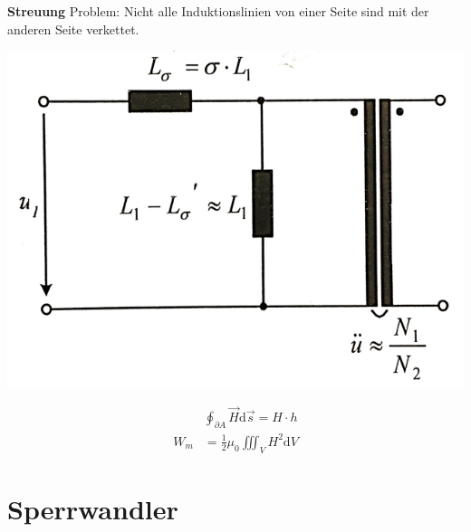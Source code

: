\documentclass[10pt,landscape]{scrartcl}
\begin{document}
\begin{multicols}{2}
\textbf{Streuung}
Problem: Nicht alle Induktionslinien von einer Seite sind mit der anderen Seite verkettet. 

\begin{minipage}[h]{0.6\linewidth}
  \includegraphics[width=\linewidth]{img/trafo/trafo_tech_esb.png}%
\end{minipage}
\begin{minipage}[h]{0.3\linewidth}\begin{align*}
      &\oint_{\partial A}\vec{H}\mathrm{d}\vec{s} = H\cdot h \\
      W_m &= \frac{1}{2}\mu_0 \iiint_V H^2\mathrm{d}V
    \end{align*}
\end{minipage}
\vfill\null
\columnbreak
\section{Sperrwandler}


\end{multicols}
\end{document}
